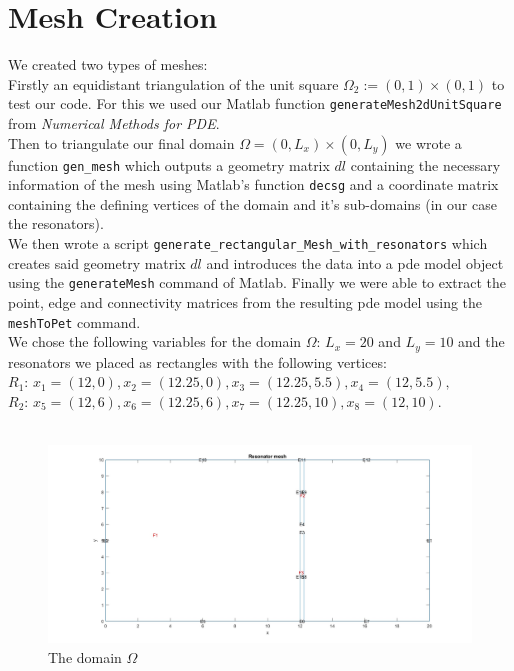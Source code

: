 \documentclass{article}
\begin{document}
\section{Mesh Creation}\label{Mesh Creation}
We created two types of meshes:\\
Firstly an equidistant triangulation of the unit square $\Omega_2 := (0,1)\times (0,1)$ to test our code. For this we used our Matlab function \texttt{generateMesh2dUnitSquare} from \textit{Numerical Methods for PDE}.\\
Then to triangulate our final domain $\Omega = (0,L_x) \times (0,L_y)$ we wrote a function \texttt{gen\_mesh} which outputs a geometry matrix $dl$ containing the necessary information of the mesh using Matlab's function \texttt{decsg} and a coordinate matrix containing the defining vertices of the domain and it's sub-domains (in our case the resonators).\\
We then wrote a script \texttt{generate\_rectangular\_Mesh\_with\_resonators} which creates said geometry matrix $dl$ and introduces the data into a pde model object using the \texttt{generateMesh} command of Matlab. Finally we were able to extract the point, edge and connectivity matrices from the resulting pde model using the \texttt{meshToPet} command. \\
We chose the following variables for the domain $\Omega$:
$L_x = 20$ and $L_y = 10$ and the resonators we placed as rectangles with the following vertices: \\
$R_1$: $x_1 = (12,0), x_2 = (12.25,0), x_3 = (12.25,5.5), x_4 = (12,5.5),$ \\
$R_2$: $x_5 = (12,6), x_6 = (12.25,6), x_7 = (12.25,10), x_8 = (12,10)$.\\ \\

\begin{figure}[h]
\centering
\includegraphics[width = \linewidth]{domain.jpg}
\caption{The domain $\Omega$}
\label{domain}
\end{figure}
\end{document}
